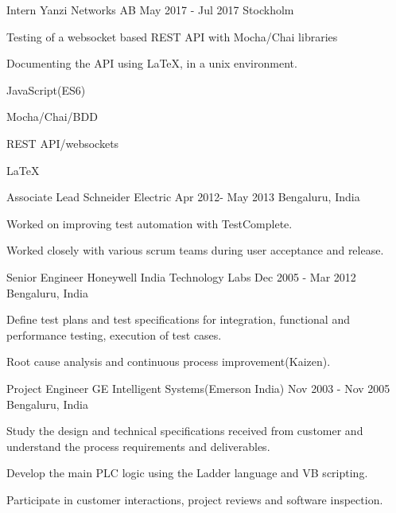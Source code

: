 \documentclass[11pt, a4paper]{awesome-cv}
\begin{document}
\begin{cventries}
    \cventry
      {Intern}
      {Yanzi Networks AB}
      {May 2017 - Jul 2017}
      {Stockholm}
      {
        \begin{cvitems}
          \item Testing of a websocket based REST API with Mocha/Chai libraries
          \item Documenting the API using LaTeX, in a unix environment.
          \item JavaScript(ES6)
          \item Mocha/Chai/BDD
          \item REST API/websockets
          \item LaTeX
          \end{cvitems}
      }


    \cventry
      {Associate Lead}
      {Schneider Electric}
      {Apr 2012- May 2013}
      {Bengaluru, India}
      {
        \begin{cvitems}
          \item Worked on improving test automation with TestComplete.
          \item Worked closely with various scrum teams during user acceptance and release.
          \end{cvitems}
      }

    \cventry
      {Senior Engineer}
      {Honeywell India Technology Labs}
      {Dec 2005 - Mar 2012}
      {Bengaluru, India}
      {
        \begin{cvitems}
        \item Define test plans and test specifications for integration, functional and performance testing, execution of test cases.
        \item Root cause analysis and continuous process improvement(Kaizen).
        \end{cvitems}
      }

    \cventry
      {Project Engineer}
      {GE Intelligent Systems(Emerson India)}
      {Nov 2003 - Nov 2005}
      {Bengaluru, India}
      {
        \begin{cvitems}
        \item Study the design and technical specifications received from customer and understand the process requirements and deliverables.
        \item Develop the main PLC logic using the Ladder language and VB scripting.
        \item Participate in customer interactions, project reviews and software inspection.
        \end{cvitems}
      }
  \end{cventries}
\end{document}
